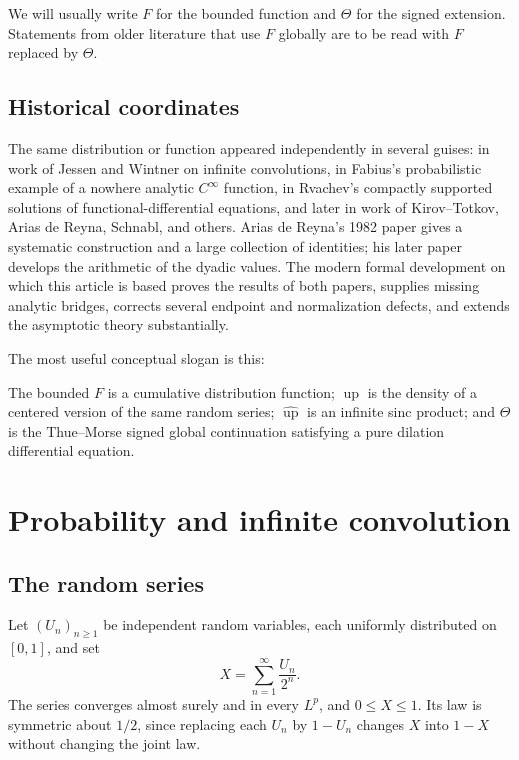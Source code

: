 \documentclass[11pt,oneside]{article}
\theoremstyle{definition}
\theoremstyle{remark}
\newcommand{\upf}{\operatorname{up}}
\newcommand{\Thetaf}{\Theta}
\begin{document}
We will usually write $F$ for the bounded function and $\Thetaf$ for the signed
extension.  Statements from older literature that use $F$ globally are to be read
with $F$ replaced by $\Thetaf$.

\subsection{Historical coordinates}

The same distribution or function appeared independently in several guises: in
work of Jessen and Wintner on infinite convolutions, in Fabius's probabilistic
example of a nowhere analytic $C^\infty$ function, in Rvachev's compactly supported
solutions of functional-differential equations, and later in work of Kirov--Totkov,
Arias de Reyna, Schnabl, and others.  Arias de Reyna's 1982 paper gives a systematic
construction and a large collection of identities; his later paper develops the
arithmetic of the dyadic values.  The modern formal development on which this
article is based proves the results of both papers, supplies missing analytic
bridges, corrects several endpoint and normalization defects, and extends the
asymptotic theory substantially.

The most useful conceptual slogan is this:

\begin{keybox}
The bounded $F$ is a cumulative distribution function; $\upf$ is the density of a
centered version of the same random series; $\widehat{\upf}$ is an infinite sinc
product; and $\Thetaf$ is the Thue--Morse signed global continuation satisfying a
pure dilation differential equation.
\end{keybox}

\section{Probability and infinite convolution}

\subsection{The random series}

Let $(U_n)_{n\ge1}$ be independent random variables, each uniformly distributed on
$[0,1]$, and set
\begin{equation}\label{eq:X-random-series}
  X=\sum_{n=1}^{\infty}\frac{U_n}{2^n}.
\end{equation}
The series converges almost surely and in every $L^p$, and $0\le X\le1$.  Its law is
symmetric about $1/2$, since replacing each $U_n$ by $1-U_n$ changes $X$ into
$1-X$ without changing the joint law.
\end{document}
